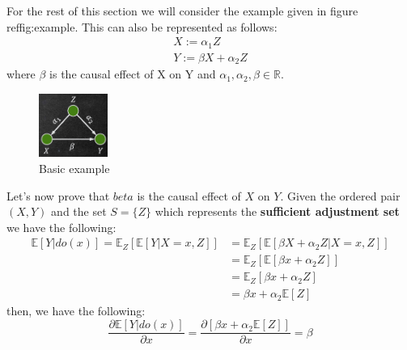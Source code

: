 For the rest of this section we will consider the example given in figure ref{fig:example}. This can also be represented as follows:
\begin{equation}
    \begin{array}{l}
        X := \alpha_1 Z \\ Y := \beta X + \alpha_2 Z
    \end{array}
\end{equation}
where $\beta$ is the causal effect of X on Y and $\alpha_1, \alpha_2, \beta\in \mathbb{R}$.

\begin{figure}[!ht]
    \centering
    \includegraphics[width=0.2\textwidth]{img/example.png}
    \caption{Basic example}
    \label{fig:example}
\end{figure}

Let’s now prove that $ beta$ is the causal effect of $X$ on $Y$. Given the ordered
pair $(X, Y)$ and the set $S  = \{Z \}$ which represents the \textbf{sufficient
    adjustment set} we have the following:
\begin{equation}
    \begin{array}{ll}
        \mathbb{E}[Y | do(x)] = \mathbb{E}_Z[\mathbb{E}[Y | X = x, Z]] & = \mathbb{E}_Z[\mathbb{E}[\beta X + \alpha_2 Z | X = x, Z]] \\
                                                                       & = \mathbb{E}_Z[\mathbb{E}[\beta x + \alpha_2 Z]]            \\
                                                                       & = \mathbb{E}_Z[\beta x + \alpha_2 Z]                        \\
                                                                       & = \beta x + \alpha_2\mathbb{E}[Z]
    \end{array}
\end{equation}
then, we have the following:
\begin{equation}
    \frac{\partial \mathbb{E}[Y |do(x)]}{\partial x} = \frac{\partial [\beta x + \alpha_2\mathbb{E}[Z]]}{\partial x} = \beta
\end{equation}


